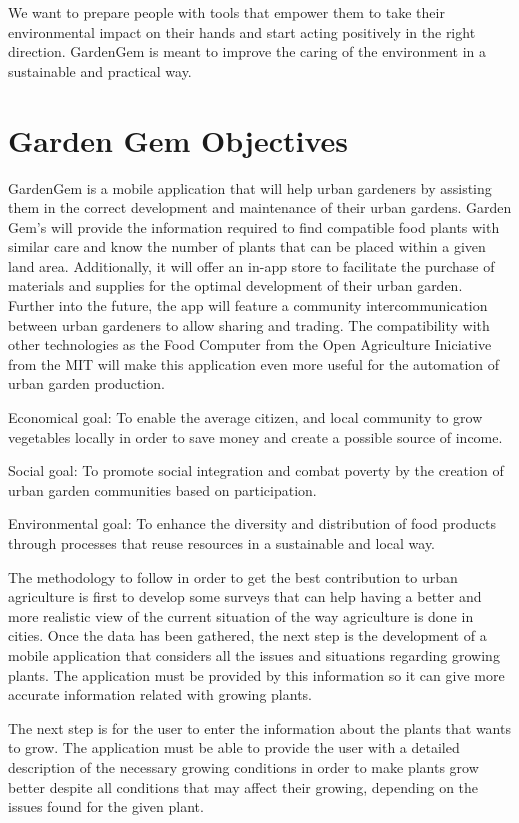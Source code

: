 We want to prepare people with tools that empower them to take their environmental impact on their hands and start acting positively in the right direction. GardenGem is meant to improve the caring of the environment in a sustainable and practical way.

\section{Garden Gem Objectives}

GardenGem is a mobile application that will help urban gardeners by assisting them in the correct development and maintenance of their urban gardens. Garden Gem’s will provide the information required to find compatible food plants with similar care and know the number of plants that can be placed within a given land area. Additionally, it will offer an in-app store to facilitate the purchase of materials and supplies for the optimal development of their urban garden. Further into the future, the app will feature a community intercommunication between urban gardeners to allow sharing and trading. The compatibility with other technologies as the Food Computer from the Open Agriculture Iniciative from the MIT will make this application even more useful for the automation of urban garden production.

Economical goal: To enable the average citizen, and local community to grow vegetables locally in order to save money and create a possible source of income. 

Social goal: To promote social integration and combat poverty by the creation of urban garden communities based on participation.

Environmental goal: To enhance the diversity and distribution of food products through processes that reuse resources in a sustainable and local way.

The methodology to follow in order to get the best contribution to urban agriculture is first to develop some surveys that can help having a better and more realistic view of the current situation of the way agriculture is done in cities. 
Once the data has been gathered, the next step is the development of a mobile application that considers all the issues and situations regarding growing plants. The application must be provided by this information so it can give more accurate information related with growing plants.

The next step is for the user to enter the information about the plants that wants to grow. The application must be able to provide the user with a detailed description of the necessary growing conditions in order to make plants grow better despite all conditions that may affect their growing, depending on the issues found for the given plant.

